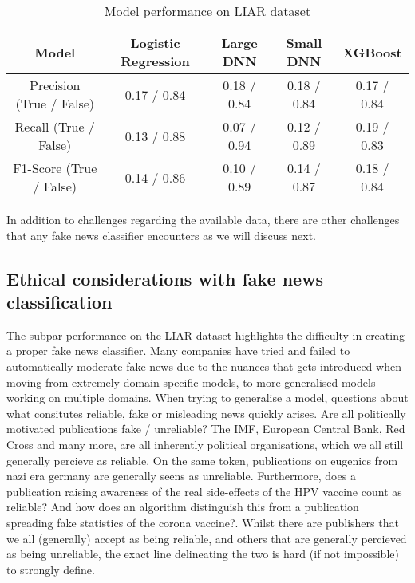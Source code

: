 \begin{table}[htpb]
  \centering
  \caption{Model performance on LIAR dataset}
  \label{tab:liarperformance}
  \begin{tabular}{c|cccc}
    Model & Logistic Regression & Large DNN & Small DNN & XGBoost \\ \hline
    Precision (True / False) & 0.17 / 0.84  & 0.18 / 0.84 & 0.18 / 0.84 & 0.17 / 0.84 \\ \hline
    Recall (True / False) & 0.13 / 0.88 & 0.07 / 0.94 & 0.12 / 0.89 & 0.19 / 0.83 \\ \hline
    F1-Score (True / False) & 0.14 / 0.86 & 0.10 / 0.89 & 0.14 / 0.87 & 0.18 / 0.84 \\ \hline
  \end{tabular}
\end{table}

In addition to challenges regarding the available data, there are other challenges that any fake news classifier
encounters as we will discuss next.

\subsection{Ethical considerations with fake news classification}
The subpar performance on the LIAR dataset highlights the difficulty in creating a proper fake news classifier. Many
companies have tried and failed to automatically moderate fake news due to the nuances that gets introduced when moving
from extremely domain specific models, to more generalised models working on multiple domains. When trying to
generalise a model, questions about what consitutes reliable, fake or misleading news quickly arises. Are all
politically motivated publications fake / unreliable? The IMF, European Central Bank, Red Cross and many more, are all
inherently political organisations, which we all still generally percieve as reliable. On the same token, publications
on eugenics from nazi era germany are generally seens as unreliable. Furthermore, does a publication raising awareness
of the real side-effects of the HPV vaccine count as reliable? And how does an algorithm distinguish this from a
publication spreading fake statistics of the corona vaccine?. Whilst there are publishers that we all (generally)
accept as being reliable, and others that are generally percieved as being unreliable, the exact line delineating the
two is hard (if not impossible) to strongly define.
